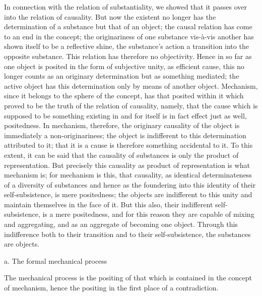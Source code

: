 In connection with the relation of substantiality,
we showed that it passes over into the relation of causality.
But now the existent no longer has the
determination of a substance but that of an object;
the causal relation has come to an end in the concept;
the originariness of one substance vis-à-vis another
has shown itself to be a reflective shine,
the substance's action a transition into the opposite substance.
This relation has therefore no objectivity.
Hence in so far as one object is posited
in the form of subjective unity, as efficient cause,
this no longer counts as an originary determination
but as something mediated;
the active object has this determination
only by means of another object.
Mechanism, since it belongs to the sphere of the concept,
has that posited within it which proved to be
the truth of the relation of causality, namely,
that the cause which is supposed to be something
existing in and for itself is in fact
effect just as well, positedness.
In mechanism, therefore,
the originary causality of the object is
immediately a non-originariness;
the object is indifferent to this
determination attributed to it;
that it is a cause is therefore
something accidental to it.
To this extent, it can be said
that the causality of substances is
only the product of representation.
But precisely this causality
as product of representation
is what mechanism is;
for mechanism is this,
that causality,
as identical determinateness of
a diversity of substances
and hence as the foundering into
this identity of their self-subsistence,
is mere positedness;
the objects are indifferent to this unity
and maintain themselves in the face of it.
But this also, their indifferent self-subsistence,
is a mere positedness,
and for this reason they are capable of
mixing and aggregating,
and as an aggregate of becoming one object.
Through this indifference both
to their transition and to their self-subsistence,
the substances are objects.

a. The formal mechanical process

The mechanical process is the positing of
that which is contained in the concept of mechanism,
hence the positing in the first place of a contradiction.

